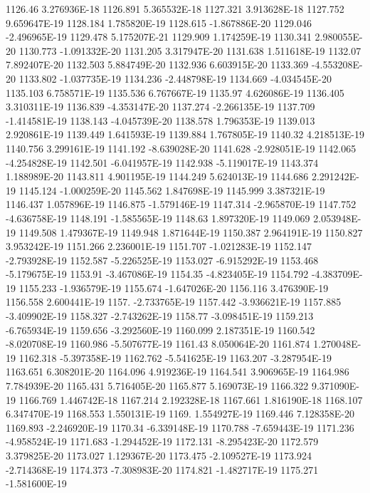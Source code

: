 1126.46  3.276936E-18
1126.891  5.365532E-18
1127.321  3.913628E-18
1127.752  9.659647E-19
1128.184  1.785820E-19
1128.615  -1.867886E-20
1129.046  -2.496965E-19
1129.478  5.175207E-21
1129.909  1.174259E-19
1130.341  2.980055E-20
1130.773  -1.091332E-20
1131.205  3.317947E-20
1131.638  1.511618E-19
1132.07  7.892407E-20
1132.503  5.884749E-20
1132.936  6.603915E-20
1133.369  -4.553208E-20
1133.802  -1.037735E-19
1134.236  -2.448798E-19
1134.669  -4.034545E-20
1135.103  6.758571E-19
1135.536  6.767667E-19
1135.97  4.626086E-19
1136.405  3.310311E-19
1136.839  -4.353147E-20
1137.274  -2.266135E-19
1137.709  -1.414581E-19
1138.143  -4.045739E-20
1138.578  1.796353E-19
1139.013  2.920861E-19
1139.449  1.641593E-19
1139.884  1.767805E-19
1140.32  4.218513E-19
1140.756  3.299161E-19
1141.192  -8.639028E-20
1141.628  -2.928051E-19
1142.065  -4.254828E-19
1142.501  -6.041957E-19
1142.938  -5.119017E-19
1143.374  1.188989E-20
1143.811  4.901195E-19
1144.249  5.624013E-19
1144.686  2.291242E-19
1145.124  -1.000259E-20
1145.562  1.847698E-19
1145.999  3.387321E-19
1146.437  1.057896E-19
1146.875  -1.579146E-19
1147.314  -2.965870E-19
1147.752  -4.636758E-19
1148.191  -1.585565E-19
1148.63  1.897320E-19
1149.069  2.053948E-19
1149.508  1.479367E-19
1149.948  1.871644E-19
1150.387  2.964191E-19
1150.827  3.953242E-19
1151.266  2.236001E-19
1151.707  -1.021283E-19
1152.147  -2.793928E-19
1152.587  -5.226525E-19
1153.027  -6.915292E-19
1153.468  -5.179675E-19
1153.91  -3.467086E-19
1154.35  -4.823405E-19
1154.792  -4.383709E-19
1155.233  -1.936579E-19
1155.674  -1.647026E-20
1156.116  3.476390E-19
1156.558  2.600441E-19
1157.  -2.733765E-19
1157.442  -3.936621E-19
1157.885  -3.409902E-19
1158.327  -2.743262E-19
1158.77  -3.098451E-19
1159.213  -6.765934E-19
1159.656  -3.292560E-19
1160.099  2.187351E-19
1160.542  -8.020708E-19
1160.986  -5.507677E-19
1161.43  8.050064E-20
1161.874  1.270048E-19
1162.318  -5.397358E-19
1162.762  -5.541625E-19
1163.207  -3.287954E-19
1163.651  6.308201E-20
1164.096  4.919236E-19
1164.541  3.906965E-19
1164.986  7.784939E-20
1165.431  5.716405E-20
1165.877  5.169073E-19
1166.322  9.371090E-19
1166.769  1.446742E-18
1167.214  2.192328E-18
1167.661  1.816190E-18
1168.107  6.347470E-19
1168.553  1.550131E-19
1169.  1.554927E-19
1169.446  7.128358E-20
1169.893  -2.246920E-19
1170.34  -6.339148E-19
1170.788  -7.659443E-19
1171.236  -4.958524E-19
1171.683  -1.294452E-19
1172.131  -8.295423E-20
1172.579  3.379825E-20
1173.027  1.129367E-20
1173.475  -2.109527E-19
1173.924  -2.714368E-19
1174.373  -7.308983E-20
1174.821  -1.482717E-19
1175.271  -1.581600E-19
